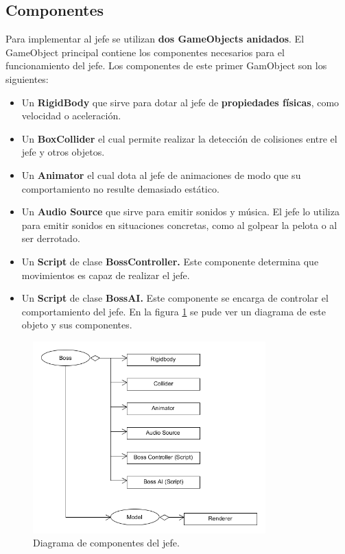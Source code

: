 \subsection{Componentes}
Para implementar al jefe se utilizan \textbf{dos GameObjects anidados}. El GameObject principal contiene los componentes necesarios para el funcionamiento del jefe. Los componentes de este primer GamObject son los siguientes:
 \begin{itemize}
	\item Un \textbf{RigidBody} que sirve para dotar al jefe de \textbf{propiedades físicas}, como velocidad o aceleración.
	\item Un \textbf{BoxCollider} el cual permite realizar la detección de colisiones entre el jefe y otros objetos.
	\item Un \textbf{Animator} el cual dota al jefe de animaciones de modo que su comportamiento no resulte demasiado estático. 
	\item Un \textbf{Audio Source} que sirve para emitir sonidos y música. El jefe lo utiliza para emitir sonidos en situaciones concretas, como al golpear la pelota o al ser derrotado.
	\item Un \textbf{Script} de clase \textbf{BossController.} Este componente determina que movimientos es capaz de realizar el jefe.
	\item Un \textbf{Script} de clase \textbf{BossAI.} Este componente se encarga de controlar el comportamiento del jefe.
En la figura \ref{diagrama_boss} se pude ver un diagrama de este objeto y sus componentes.
\end{itemize}
\begin{figure}[h]
	\includegraphics[width=0.8\textwidth]{images/estructura/jefe/boss}
	\centering
	\caption{Diagrama de componentes del jefe.}
	\label{diagrama_boss}
\end{figure}

